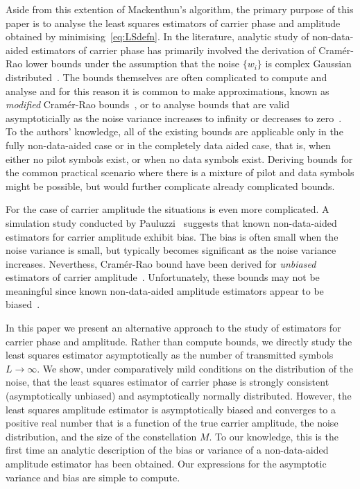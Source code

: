\documentclass[journal]{IEEEtran}
\begin{document}
Aside from this extention of Mackenthun's algorithm, the primary purpose of this paper is to analyse the least squares estimators of carrier phase and amplitude obtained by minimising~\eqref{eq:LSdefn}.  In the literature, analytic study of non-data-aided estimators of carrier phase has primarily involved the derivation of Cram\'{e}r-Rao lower bounds under the assumption that the noise $\{w_i\}$ is complex Gaussian distributed~\cite{Delmas_exact_crb_psk_2008,950345,Steendam_lowsnr_crb_2001,Cowley_crbs_phase_freq_1996,DAndrea_modified_bounds_1994}.  The bounds themselves are often complicated to compute and analyse and for this reason it is common to make approximations, known as \emph{modified} Cram\'{e}r-Rao bounds~\cite{DAndrea_modified_bounds_1994,Pollok_mckilliam_crb_cpm_2013}, or to analyse bounds that are valid asymptoticially as the noise variance increases to infinity or decreases to zero~\cite{Moeneclaey_limit_crbs_1998,Steendam_lowsnr_crb_2001,Delmas_exact_crb_psk_2008}.  To the authors' knowledge, all of the existing bounds are applicable only in the fully non-data-aided case or in the completely data aided case, that is, when either no pilot symbols exist, or when no data symbols exist.  Deriving bounds for the common practical scenario where there is a mixture of pilot and data symbols might be possible, but would further complicate already complicated bounds.

For the case of carrier amplitude the situations is even more complicated.  A simulation study conducted by Pauluzzi~\cite{Pauluzzi2000} suggests that known non-data-aided estimators for carrier amplitude exhibit bias.  The bias is often small when the noise variance is small, but typically becomes significant as the noise variance increases.  Neverthess, Cram\'{e}r-Rao bound have been derived for \emph{unbiased} estimators of carrier amplitude~\cite{Alagha_crb_snr_bpsk_qpsk_2001,Delmas_exact_crb_psk_2008}.  Unfortunately, these bounds may not be meaningful since known non-data-aided amplitude estimators appear to be biased~\cite{Pauluzzi2000}. 

In this paper we present an alternative approach to the study of estimators for carrier phase and amplitude.  Rather than compute bounds, we directly study the least squares estimator asymptotically as the number of transmitted symbols $L\to \infty$.  We show, under comparatively mild conditions on the distribution of the noise, that the least squares estimator of carrier phase is strongly consistent (asymptotically unbiased) and asymptotically normally distributed.  However, the least squares amplitude estimator is asymptotically biased and converges to a positive real number that is a function of the true carrier amplitude, the noise distribution, and the size of the constellation $M$.  To our knowledge, this is the first time an analytic description of the bias or variance of a non-data-aided amplitude estimator has been obtained.  Our expressions for the asymptotic variance and bias are simple to compute.  %
\end{document}
